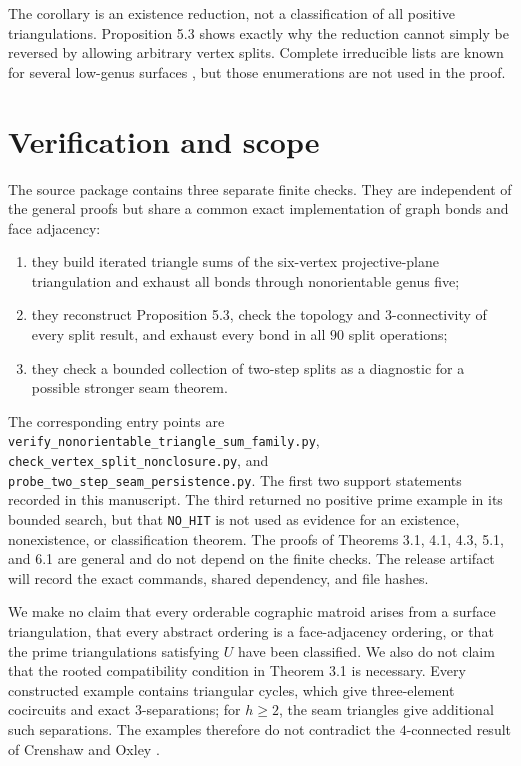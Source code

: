 \documentclass[11pt]{article}
\begin{document}
The corollary is an existence reduction, not a classification of all positive
triangulations. Proposition 5.3 shows exactly why the reduction cannot simply
be reversed by allowing arbitrary vertex splits. Complete irreducible lists
are known for several low-genus surfaces \cite{sulanke}, but those enumerations are not
used in the proof.

\section{Verification and scope}


The source package contains three separate finite checks. They are independent
of the general proofs but share a common exact implementation of graph bonds
and face adjacency:

\begin{enumerate}
\item they build iterated triangle sums of the six-vertex projective-plane
   triangulation and exhaust all bonds through nonorientable genus five;
\item they reconstruct Proposition 5.3, check the topology and
   $3$-connectivity of every split result, and exhaust every bond in all $90$
   split operations;
\item they check a bounded collection of two-step splits as a diagnostic for a
   possible stronger seam theorem.
\end{enumerate}


The corresponding entry points are
\texttt{verify\_nonorientable\_triangle\_sum\_family.py},
\texttt{check\_vertex\_split\_nonclosure.py}, and
\texttt{probe\_two\_step\_seam\_persistence.py}. The first two support statements
recorded in this manuscript. The third returned no positive prime example in
its bounded search, but that \texttt{NO\_HIT} is not used as evidence for an
existence, nonexistence, or classification theorem. The proofs of Theorems
3.1, 4.1, 4.3, 5.1, and 6.1 are general and do not depend on the finite
checks. The release artifact will record the exact commands, shared
dependency, and file hashes.

We make no claim that every orderable cographic matroid arises from a surface
triangulation, that every abstract ordering is a face-adjacency ordering, or
that the prime triangulations satisfying $U$ have been classified. We also do
not claim that the rooted compatibility condition in Theorem 3.1 is
necessary. Every constructed example contains triangular cycles, which give
three-element cocircuits and exact $3$-separations; for $h\geq2$, the seam
triangles give additional such separations. The examples therefore do not
contradict the $4$-connected result of Crenshaw and Oxley \cite{crenshaw-oxley-v12}.
\end{document}
